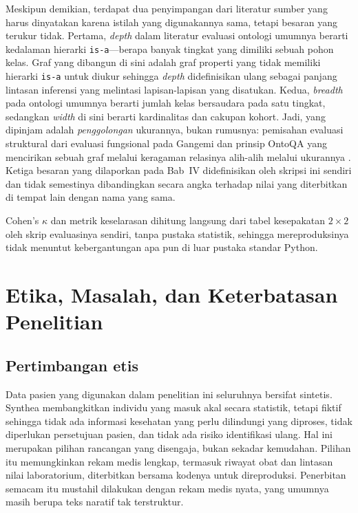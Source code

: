 Meskipun demikian, terdapat dua penyimpangan dari literatur sumber yang harus dinyatakan karena istilah yang digunakannya sama, tetapi
besaran yang terukur tidak. Pertama, \emph{depth} dalam literatur evaluasi ontologi umumnya berarti
kedalaman hierarki \texttt{is-a}---berapa banyak tingkat yang dimiliki sebuah pohon
kelas. Graf yang dibangun di sini adalah graf properti yang tidak memiliki hierarki
\texttt{is-a} untuk diukur sehingga \emph{depth} didefinisikan ulang sebagai panjang lintasan
inferensi
yang melintasi lapisan-lapisan yang disatukan. Kedua, \emph{breadth} pada ontologi umumnya
berarti jumlah kelas bersaudara pada satu tingkat, sedangkan \emph{width} di sini berarti
kardinalitas dan cakupan kohort. Jadi, yang dipinjam adalah \emph{penggolongan} ukurannya, bukan
rumusnya: pemisahan evaluasi struktural dari evaluasi fungsional pada Gangemi
\cite{gangemi2006} dan prinsip OntoQA yang mencirikan sebuah graf melalui keragaman relasinya
alih-alih melalui ukurannya \cite{tartir2005}. Ketiga besaran yang dilaporkan pada Bab~IV
didefinisikan oleh skripsi ini sendiri dan tidak semestinya dibandingkan secara angka terhadap
nilai yang diterbitkan di tempat lain dengan nama yang sama.

Cohen's $\kappa$ dan metrik keselarasan dihitung langsung dari tabel kesepakatan
$2\times2$ oleh skrip evaluasinya sendiri, tanpa pustaka statistik, sehingga
mereproduksinya tidak menuntut kebergantungan apa pun di luar pustaka standar Python.

\section{Etika, Masalah, dan Keterbatasan Penelitian}
\label{sec:ethics}

\subsection{Pertimbangan etis}
Data pasien yang digunakan dalam penelitian ini seluruhnya bersifat sintetis. Synthea
membangkitkan individu yang masuk akal secara statistik, tetapi fiktif \cite{synthea} sehingga
tidak ada informasi kesehatan yang perlu dilindungi yang diproses, tidak diperlukan persetujuan pasien,
dan tidak ada risiko identifikasi ulang. Hal ini merupakan pilihan rancangan yang disengaja, bukan sekadar kemudahan. Pilihan itu
memungkinkan rekam medis lengkap, termasuk riwayat obat dan lintasan nilai laboratorium,
diterbitkan bersama kodenya untuk direproduksi. Penerbitan semacam itu mustahil dilakukan
dengan rekam medis nyata, yang umumnya masih berupa teks naratif tak terstruktur.

